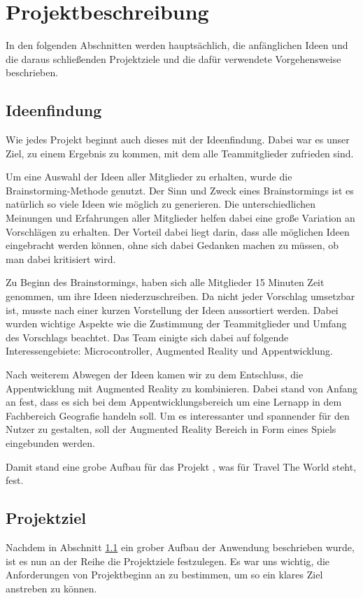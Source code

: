 \chapter{Projektbeschreibung}\label{ch:projektbeschreibung}
In den folgenden Abschnitten werden hauptsächlich, die anfänglichen Ideen und die daraus schließenden Projektziele und die dafür verwendete Vorgehensweise beschrieben.

\section{Ideenfindung}\label{ideenfindung}
Wie jedes Projekt beginnt auch dieses mit der Ideenfindung. Dabei war es unser Ziel, zu einem Ergebnis zu kommen, mit dem alle Teammitglieder zufrieden sind. 

Um eine Auswahl der Ideen aller Mitglieder zu erhalten, wurde die Brainstorming-Methode genutzt. Der Sinn und Zweck eines Brainstormings ist es natürlich so viele Ideen wie möglich zu generieren. Die unterschiedlichen Meinungen und Erfahrungen aller Mitglieder helfen dabei eine große Variation an Vorschlägen zu erhalten. Der Vorteil dabei liegt darin, dass alle möglichen Ideen eingebracht werden können, ohne sich dabei Gedanken machen zu müssen, ob man dabei kritisiert wird. 

Zu Beginn des Brainstormings, haben sich alle Mitglieder 15 Minuten Zeit genommen, um ihre Ideen niederzuschreiben. Da nicht jeder Vorschlag umsetzbar ist, musste nach einer kurzen Vorstellung der Ideen aussortiert werden. Dabei wurden wichtige Aspekte wie die Zustimmung der Teammitglieder und Umfang des Vorschlags beachtet. Das Team einigte sich dabei auf folgende Interessengebiete: Microcontroller, Augmented Reality und Appentwicklung.

Nach weiterem Abwegen der Ideen kamen wir zu dem Entschluss, die Appentwicklung mit Augmented Reality zu kombinieren. Dabei stand von Anfang an fest, dass es sich bei dem Appentwicklungsbereich um eine Lernapp in dem Fachbereich Geografie handeln soll. Um es interessanter und spannender für den Nutzer zu gestalten, soll der Augmented Reality Bereich in Form eines Spiels eingebunden werden. 

Damit stand eine grobe Aufbau für das Projekt  , was für Travel The World steht, fest.

\section{Projektziel}\label{projektziel}
Nachdem in Abschnitt \ref{ideenfindung} ein grober Aufbau der Anwendung beschrieben wurde, ist es nun an der Reihe die Projektziele festzulegen. Es war uns wichtig, die Anforderungen von Projektbeginn an zu bestimmen, um so ein klares Ziel anstreben zu können.

